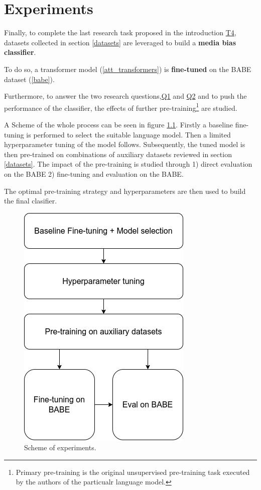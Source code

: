 \chapter{Experiments}\label{experiments}
Finally, to complete the last research task proposed in the introduction \hyperref[problem_definition]{T4}, datasets collected in section \ref{datasets} are leveraged to build a \textbf{media bias classifier}.

To do so, a transformer model (\ref{att_transformers}) is \textbf{fine-tuned} on the BABE dataset (\ref{babe}).


Furthermore, to answer the two research questions,\hyperref[Q1]{Q1} and \hyperref[Q2]{Q2} and to push the performance of the classifier, the effects of further pre-training\footnote{Primary pre-training is the original unsupervised pre-training task executed by the authors of the particualr language model.} are studied.

A Scheme of the whole process can be seen in figure \ref{fig:pipeline}. Firstly a baseline fine-tuning is performed to select the suitable language model. Then a limited hyperparameter tuning of the model follows. Subsequently, the tuned model is then pre-trained on combinations of auxiliary datasets reviewed in section \ref{datasets}. The impact of the pre-training is studied through 1) direct evaluation on the BABE 2) fine-tuning and evaluation on the BABE.

The optimal pre-training strategy and hyperparameters are then used to build the final clasifier.
 
\begin{figure}[h]
  \includegraphics[scale=0.5]{my_modules/multimedia/pipeline.png}
  \caption{Scheme of experiments.}
  \label{fig:pipeline}
\end{figure}
 
